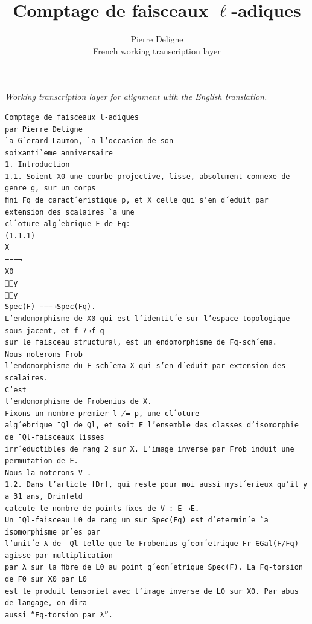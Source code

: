 \documentclass[11pt]{article}
\title{Comptage de faisceaux \(\ell\)-adiques}
\author{Pierre Deligne\\French working transcription layer}
\date{}
\begin{document}
\maketitle
\begin{center}\emph{Working transcription layer for alignment with the English translation.}\end{center}
\begin{Verbatim}[breaklines=true,fontsize=\small]
Comptage de faisceaux l-adiques
par Pierre Deligne
`a G´erard Laumon, `a l’occasion de son
soixanti`eme anniversaire
1. Introduction
1.1. Soient X0 une courbe projective, lisse, absolument connexe de genre g, sur un corps
ﬁni Fq de caract´eristique p, et X celle qui s’en d´eduit par extension des scalaires `a une
clˆoture alg´ebrique F de Fq:
(1.1.1)
X
−−−→
X0
y
y
Spec(F) −−−→Spec(Fq).
L’endomorphisme de X0 qui est l’identit´e sur l’espace topologique sous-jacent, et f 7→f q
sur le faisceau structural, est un endomorphisme de Fq-sch´ema.
Nous noterons Frob
l’endomorphisme du F-sch´ema X qui s’en d´eduit par extension des scalaires.
C’est
l’endomorphisme de Frobenius de X.
Fixons un nombre premier l ̸= p, une clˆoture
alg´ebrique ¯Ql de Ql, et soit E l’ensemble des classes d’isomorphie de ¯Ql-faisceaux lisses
irr´eductibles de rang 2 sur X. L’image inverse par Frob induit une permutation de E.
Nous la noterons V .
1.2. Dans l’article [Dr], qui reste pour moi aussi myst´erieux qu’il y a 31 ans, Drinfeld
calcule le nombre de points ﬁxes de V : E →E.
Un ¯Ql-faisceau L0 de rang un sur Spec(Fq) est d´etermin´e `a isomorphisme pr`es par
l’unit´e λ de ¯Ql telle que le Frobenius g´eom´etrique Fr ∈Gal(F/Fq) agisse par multiplication
par λ sur la ﬁbre de L0 au point g´eom´etrique Spec(F). La Fq-torsion de F0 sur X0 par L0
est le produit tensoriel avec l’image inverse de L0 sur X0. Par abus de langage, on dira
aussi “Fq-torsion par λ”.


\end{Verbatim}
\end{document}
